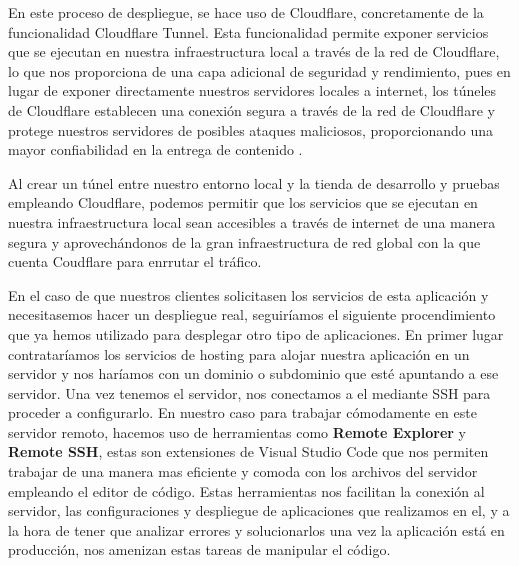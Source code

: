 \documentclass[12pt]{article}
\begin{document}
En este proceso de despliegue, se hace uso de Cloudflare, concretamente de la funcionalidad Cloudflare Tunnel. Esta funcionalidad permite exponer servicios que se ejecutan
en nuestra infraestructura local a través de la red de Cloudflare, lo que nos proporciona de una capa adicional de seguridad y rendimiento, pues en lugar de 
exponer directamente nuestros servidores locales a internet, los túneles de Cloudflare establecen una conexión segura a través de la red de Cloudflare y protege nuestros
servidores de posibles ataques maliciosos, proporcionando una mayor confiabilidad en la entrega de contenido \cite{cloudflare}. 

Al crear un túnel entre nuestro entorno local y la tienda de desarrollo y pruebas empleando Cloudflare, podemos permitir que los servicios que se ejecutan en nuestra infraestructura local
sean accesibles a través de internet de una manera segura y aprovechándonos de la gran infraestructura de red global con la que cuenta Coudflare para enrrutar el tráfico.

En el caso de que nuestros clientes solicitasen los servicios de esta aplicación y necesitasemos hacer un despliegue real, seguiríamos el siguiente procendimiento que ya hemos utilizado para
desplegar otro tipo de aplicaciones.
En primer lugar contrataríamos los servicios de hosting para alojar nuestra aplicación en un servidor y nos haríamos con un dominio o subdominio
que esté apuntando a ese servidor. Una vez tenemos el servidor, nos conectamos a el mediante SSH para proceder a configurarlo. En nuestro caso para trabajar cómodamente en este servidor remoto,
hacemos uso de herramientas como \textbf{Remote Explorer} y \textbf{Remote SSH}, estas son extensiones de Visual Studio Code que nos permiten trabajar de una manera mas eficiente y comoda con los archivos del
servidor empleando el editor de código. Estas herramientas nos facilitan la conexión al servidor, las configuraciones y despliegue de aplicaciones que realizamos en el, y a la hora 
de tener que analizar errores y solucionarlos una vez la aplicación está en producción, nos amenizan estas tareas de manipular el código.
\end{document}
